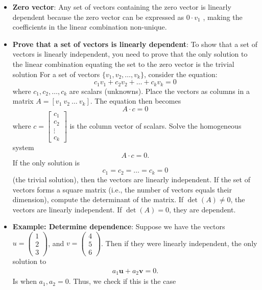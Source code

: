 \documentclass{report}
\begin{document}
\begin{itemize}
    \item \textbf{Zero vector}: Any set of vectors containing the zero vector is linearly dependent because the zero vector can be expressed as $0 \cdot v_{1}$ , making the coefficients in the linear combination non-unique.
    \item \textbf{Prove that a set of vectors is linearly dependent}: 
To show that a set of vectors is linearly independent, you need to prove that the only solution to the linear combination equating the set to the zero vector is the trivial solution
\bigbreak \noindent 
For a set of vectors $\{v_1, v_2, \dots, v_k\}$, consider the equation:
\[
c_1 v_1 + c_2 v_2 + \dots + c_k v_k = 0
\]
where $c_1, c_2, \dots, c_k$ are scalars (unknowns).
\bigbreak \noindent 
    Place the vectors as columns in a matrix $A = [v_1 \ v_2 \ \dots \ v_k]$.
    \bigbreak \noindent 
    The equation then becomes
    \[
    A \cdot c = 0
    \]
    where $c = 
    \begin{bmatrix}
    c_1 \\ 
    c_2 \\ 
    \vdots \\ 
    c_k 
    \end{bmatrix}
    $
    is the column vector of scalars.
    \bigbreak \noindent 
    Solve the homogeneous system 
    \[
        A \cdot c = 0.
    \]
    If the only solution is 
    \[
        c_1 = c_2 = \dots = c_k = 0
    \]
    (the trivial solution), then the vectors are linearly independent.
    \bigbreak \noindent 
    If the set of vectors forms a square matrix (i.e., the number of vectors equals their dimension), compute the determinant of the matrix.
    \bigbreak \noindent 
    If $\det(A) \neq 0$, the vectors are linearly independent. If $\det(A) = 0$, they are dependent.
\item \textbf{Example: Determine dependence}: Suppose we have the vectors $u = \begin{pmatrix} 1 \\ 2 \\ 3 \end{pmatrix} $, and $v = \begin{pmatrix} 4 \\ 5 \\ 6 \end{pmatrix}$. Then if they were linearly independent, the only solution to
    \begin{align*}
        a_{1}\mathbf{u}  + a_{2} \mathbf{v} = 0
    .\end{align*}
    Is when $a_{1}, a_{2} = 0$. Thus, we check if this is the case

\end{itemize}
\end{document}

